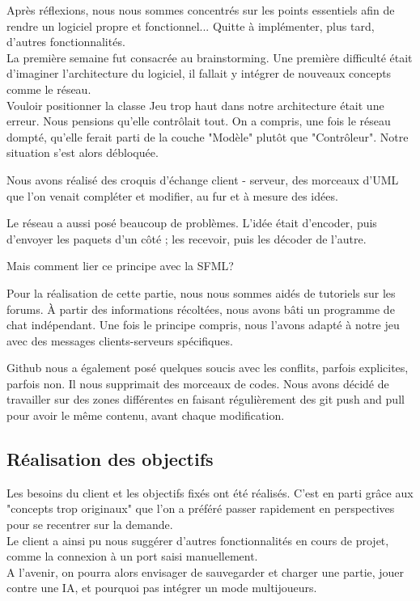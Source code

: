 \documentclass[a4paper,oneside]{article}
\begin{document}
Après réflexions, nous nous sommes concentrés sur les points essentiels afin de rendre un logiciel propre et fonctionnel... Quitte à implémenter, plus tard, d'autres fonctionnalités.
\\

La première semaine fut consacrée au brainstorming. Une première difficulté était d'imaginer l'architecture du logiciel, il fallait y intégrer de nouveaux concepts comme le réseau. 
\\
Vouloir positionner la classe Jeu trop haut dans notre architecture était une erreur. Nous pensions qu'elle contrôlait tout. 
On a compris, une fois le réseau dompté, qu'elle ferait parti de la couche "Modèle" plutôt que "Contrôleur". Notre situation s'est alors débloquée. 


Nous avons réalisé des croquis d'échange client - serveur, des morceaux d'UML que l'on venait compléter et modifier, au fur et à mesure des idées.


Le réseau a aussi posé beaucoup de problèmes. L'idée était d'encoder, puis d'envoyer les paquets d'un côté ; les recevoir, puis les décoder de l'autre.

 
Mais comment lier ce principe avec la SFML? 


Pour la réalisation de cette partie, nous nous sommes aidés de tutoriels sur les forums. À partir des informations récoltées, nous avons bâti un programme de chat indépendant. 
Une fois le principe compris, nous l'avons adapté à notre jeu avec des messages clients-serveurs spécifiques.

Github nous a également posé quelques soucis avec les conflits, parfois explicites, parfois non. Il nous supprimait des morceaux de codes. 
Nous avons décidé de travailler sur des zones différentes en faisant régulièrement des git push and pull pour avoir le même contenu, avant chaque modification.


\subsection{Réalisation des objectifs }


Les besoins du client et les objectifs fixés ont été réalisés. 
C'est en parti grâce aux "concepts trop originaux" que l'on a préféré passer rapidement en perspectives pour se recentrer sur la demande.
\\
Le client a ainsi pu nous suggérer d'autres fonctionnalités en cours de projet, comme la connexion à un port saisi manuellement.
\\
A l'avenir, on pourra alors envisager de sauvegarder et charger une partie, jouer contre une IA, et pourquoi pas intégrer un mode multijoueurs.
\end{document}
